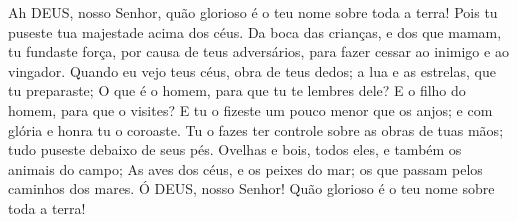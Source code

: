 
{\PP 
  Ah DEUS, nosso Senhor, quão glorioso é o teu nome sobre toda a terra! Pois tu puseste tua majestade acima dos céus.
  Da boca das crianças, e dos que mamam, tu fundaste força, por causa de teus adversários, para fazer cessar ao inimigo e ao vingador.
  Quando eu vejo teus céus, obra de teus dedos; a lua e as estrelas, que tu preparaste;
  O que é o homem, para que tu te lembres dele? E
{} o filho do homem, para que o visites?
  E tu o fizeste um pouco menor que os anjos; e com glória e honra tu o coroaste.
  Tu o fazes ter controle sobre as obras de tuas mãos; tudo puseste debaixo de seus pés.
  Ovelhas e bois, todos eles, e também os animais do campo;
  As aves dos céus, e os peixes do mar;
{} os que passam pelos caminhos dos mares.
  Ó DEUS, nosso Senhor! Quão glorioso é o teu nome sobre toda a terra!
\par }



